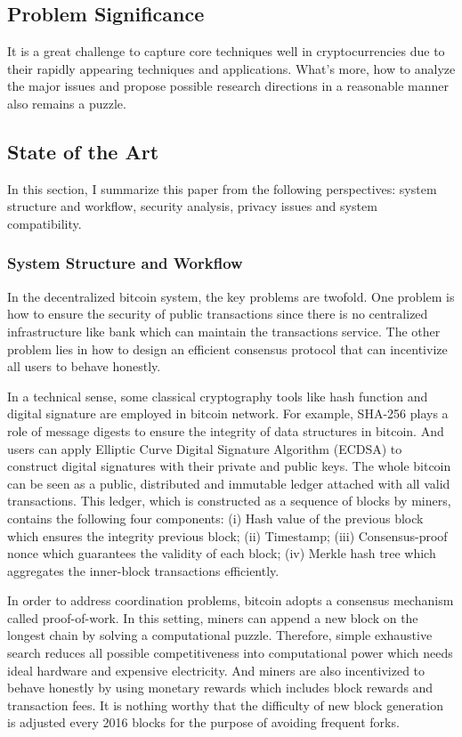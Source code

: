 \documentclass[conference]{IEEEtran}
\begin{document}
\subsection{Problem Significance}
It is a great challenge to capture core techniques well in cryptocurrencies due to their rapidly appearing techniques and applications.
%
What's more, how to analyze the major issues and propose possible research directions in a reasonable manner also remains a puzzle.


\subsection{State of the Art}
In this section, I summarize this paper from the following perspectives: system structure and workflow, security analysis, privacy issues and system compatibility.

\subsubsection{System Structure and Workflow}
In the decentralized bitcoin system, the key problems are twofold. 
%
One problem is how to ensure the security of public transactions since there is no centralized infrastructure like bank which can maintain the transactions service.
%
The other problem lies in how to design an efficient consensus protocol that can incentivize all users to behave honestly.

In a technical sense, some classical cryptography tools like hash function and digital signature are employed in bitcoin network.
%
For example, SHA-256 plays a role of message digests to ensure the integrity of data structures in bitcoin.
%
And users can apply Elliptic Curve Digital Signature Algorithm (ECDSA)\cite{johnson2001elliptic} to construct digital signatures with their private and public keys.
%
The whole bitcoin can be seen as a public, distributed and immutable ledger attached with all valid transactions.
%
This ledger, which is constructed as a sequence of blocks by miners, contains the following four components:
(i) Hash value of the previous block which ensures the integrity previous block; 
(ii) Timestamp; 
(iii) Consensus-proof nonce which guarantees the validity of each block;  
(iv) Merkle hash tree which aggregates the inner-block transactions efficiently.

In order to address coordination problems, bitcoin adopts a consensus mechanism called proof-of-work.
%
In this setting, miners can append a new block on the longest chain by solving a computational puzzle.
%
Therefore, simple exhaustive search reduces all possible competitiveness into computational power which needs ideal hardware and expensive electricity.
%
And miners are also incentivized to behave honestly by using monetary rewards which includes block rewards and transaction fees.
%
It is nothing worthy that the difficulty of new block generation is adjusted every 2016 blocks for the purpose of avoiding frequent forks.
\end{document}
